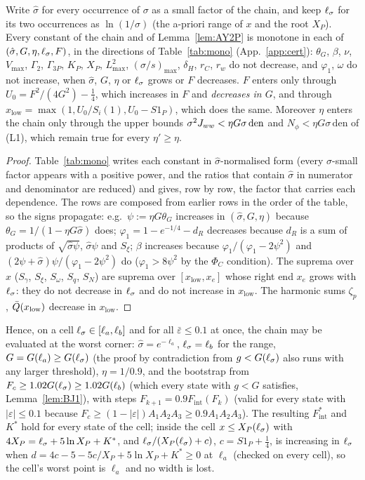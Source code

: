 \begin{lemma}[monotonicity] \proofst
\label{lem:BH1}
Write $\hat\sigma$ for every occurrence of $\sigma$ as a small factor of the chain, and keep $\ell_\sigma$ for its two occurrences as $\ln(1/\sigma)$ (the
a-priori range of $x$ and the root $X_P$). Every constant of the chain and of Lemma~\ref{lem:AY2P} is monotone in each of $(\hat\sigma,G,\eta,\ell_\sigma,F)$,
in the directions of Table~\ref{tab:mono} (App.~\ref{app:cert}): $\theta_G$, $\beta$, $\nu$, $V_{\max}$, $\Gamma_2$, $\Gamma_{3P}$, $K_P$, $X_P$, $L^2_{\max}$,
$(\sigma/s)_{\max}$, $\delta_H$, $r_C$, $r_w$ do not decrease, and $\varphi_1$, $\omega$ do not increase, when $\hat\sigma$, $G$, $\eta$ or $\ell_\sigma$ grows or $F$
decreases. $F$ enters only through $U_0=F^2/(4G^2)-\tfrac14$, which increases in $F$ and \emph{decreases in $G$}, and through
$x_{\mathrm{low}}=\max(1,U_0/S_i(1),U_0-S1_P)$, which does the same. Moreover $\eta$ enters the chain only through the upper bounds
$\sigma^2J_{ww}<\eta G\sigma\,\mathrm{den}$ and $N_\phi<\eta G\sigma\,\mathrm{den}$ of (L1), which remain true for every $\eta'\ge\eta$.
\end{lemma}
\begin{proof}
Table~\ref{tab:mono} writes each constant in $\hat\sigma$-normalised form (every $\sigma$-small factor appears with a positive power, and the
ratios that contain $\hat\sigma$ in numerator and denominator are reduced) and gives, row by row, the factor that carries each dependence.
The rows are composed from earlier rows in the order of the table, so the signs propagate: e.g.\ $\psi:=\eta G\theta_G$ increases in $(\hat\sigma,G,\eta)$
because $\theta_G=1/(1-\eta G\hat\sigma)$ does; $\varphi_1=1-e^{-1/4}-d_R$ decreases because $d_R$ is a sum of products of $\sqrt{\hat\sigma\psi}$, $\hat\sigma\psi$
and $S_\xi$; $\beta$ increases because $\varphi_1/(\varphi_1-2\psi^2)$ and $(2\psi+\hat\sigma)\psi/(\varphi_1-2\psi^2)$ do ($\varphi_1>8\psi^2$ by the $\Phi_C$
condition). The suprema over $x$ ($S_\gamma$, $S_\xi$, $S_\omega$, $S_q$, $S_N$) are suprema over $[x_{\mathrm{low}},x_e]$ whose right end $x_e$ grows with
$\ell_\sigma$: they do not decrease in $\ell_\sigma$ and do not increase in $x_{\mathrm{low}}$. The harmonic sums $\zeta_p$, $\bar Q(x_{\mathrm{low}})$ decrease in $x_{\mathrm{low}}$.
\end{proof}

Hence, on a cell $\ell_\sigma\in[\ell_a,\ell_b]$ and for all $\bar\varepsilon\le0.1$ at once, the chain may be evaluated at the worst corner: $\hat\sigma=e^{-\ell_a}$,
$\ell_\sigma=\ell_b$ for the range, $G=G(\ell_a)\ge G(\ell_\sigma)$ (the proof by contradiction from $g<G(\ell_\sigma)$ also runs with any larger threshold), $\eta=1/0.9$, and the
bootstrap from $F_c\ge1.02G(\ell_\sigma)\ge1.02G(\ell_b)$ (which every state with $g<G$ satisfies, Lemma~\ref{lem:BJ1}), with steps $F_{k+1}=0.9F_{\mathrm{int}}(F_k)$ (valid for every state with $|\varepsilon|\le0.1$ because
$F_c\ge(1-|\varepsilon|)A_1A_2A_3\ge0.9A_1A_2A_3$). The resulting $F_{\mathrm{int}}^*$ and $K^*$ hold for every state of the cell; inside the cell
$x\le X_P(\ell_\sigma)$ with $4X_P=\ell_\sigma+5\ln X_P+K^*$, and $\ell_\sigma/(X_P(\ell_\sigma)+c)$, $c=S1_P+\tfrac14$, is increasing in $\ell_\sigma$ when
$d=4c-5-5c/X_P+5\ln X_P+K^*\ge0$ at $\ell_a$ (checked on every cell), so the cell's worst point is $\ell_a$ and no width is lost.

